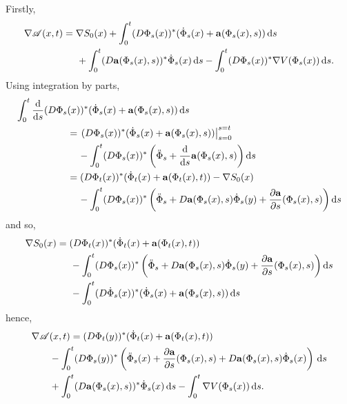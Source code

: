 \documentclass[a4paper,12pt,draft]{report}
\theoremstyle{remark}
\theoremstyle{definition}
\begin{document}
{
Firstly,
\begin{align}
\nabla\mathscr{A}(x, t) & = \nabla S_0(x) + \int_0^t(D\Phi_s(x))^*(\dot{\Phi}_s(x) + \bold{a}(\Phi_s(x), s))\,\mathrm{d}s\nonumber\\
& \hspace{0.5cm} + \int_0^t(D\bold{a}(\Phi_s(x), s))^*\dot{\Phi}_s(x)\,\mathrm{d}s - \int_0^t(D\Phi_s(x))^*\nabla V(\Phi_s(x))\,\mathrm{d}s.\nonumber
\end{align}
Using integration by parts,
\begin{align}
\int_0^t\frac{\mathrm{d}}{\mathrm{d}s}(D\Phi_s&(x))^*(\dot{\Phi}_s(x) + \bold{a}(\Phi_s(x), s))\,\mathrm{d}s\nonumber\\
& = \left.(D\Phi_s(x))^*(\dot{\Phi}_s(x) + \bold{a}(\Phi_s(x), s))\right|_{s = 0}^{s = t}\nonumber\\
& \hspace{0.4cm} - \int_0^t(D\Phi_s(x))^*\left(\ddot{\Phi}_s + \frac{\mathrm{d}}{\mathrm{d}s}\bold{a}(\Phi_s(x), s)\right)\mathrm{d}s\nonumber\\
& = (D\Phi_t(x))^*(\dot{\Phi}_t(x) + \bold{a}(\Phi_t(x), t)) - \nabla S_0(x)\nonumber\\
& \hspace{0.4cm} - \int_0^t(D\Phi_s(x))^*\left(\ddot{\Phi}_s + D\bold{a}(\Phi_s(x), s)\dot{\Phi}_s(y) + \frac{\partial\bold{a}}{\partial s}(\Phi_s(x), s)\right)\mathrm{d}s\nonumber
\end{align}
and so,
\begin{align}
\nabla S_0(x) & = (D\Phi_t(x))^*(\dot{\Phi}_t(x) + \bold{a}(\Phi_t(x), t))\nonumber\\
& \hspace{0.5cm} - \int_0^t(D\Phi_s(x))^*\left(\ddot{\Phi}_s + D\bold{a}(\Phi_s(x), s)\dot{\Phi}_s(y) + \frac{\partial\bold{a}}{\partial s}(\Phi_s(x), s)\right)\mathrm{d}s\nonumber\\
& \hspace{0.5cm} - \int_0^t(D\dot{\Phi}_s(x))^*(\dot{\Phi}_s(x) + \bold{a}(\Phi_s(x), s))\,\mathrm{d}s\nonumber
\end{align}
hence,
\begin{align}
\nabla\mathscr{A} & (x, t) = (D\Phi_t(y))^*(\dot{\Phi}_t(x) + \bold{a}(\Phi_t(x), t))\nonumber\\
& - \int_0^t(D\Phi_s(y))^*\left(\ddot{\Phi}_s(x) + \frac{\partial\bold{a}}{\partial s}(\Phi_s(x), s) + D\bold{a}(\Phi_s(x), s)\dot{\Phi}_s(x)\right)\,\mathrm{d}s\nonumber\\
& + \int_0^t(D\bold{a}(\Phi_s(x), s))^*\dot{\Phi}_s(x)\,\mathrm{d}s - \int_0^t\nabla V(\Phi_s(x))\,\mathrm{d}s.\nonumber

\end{align}}
\end{document}
